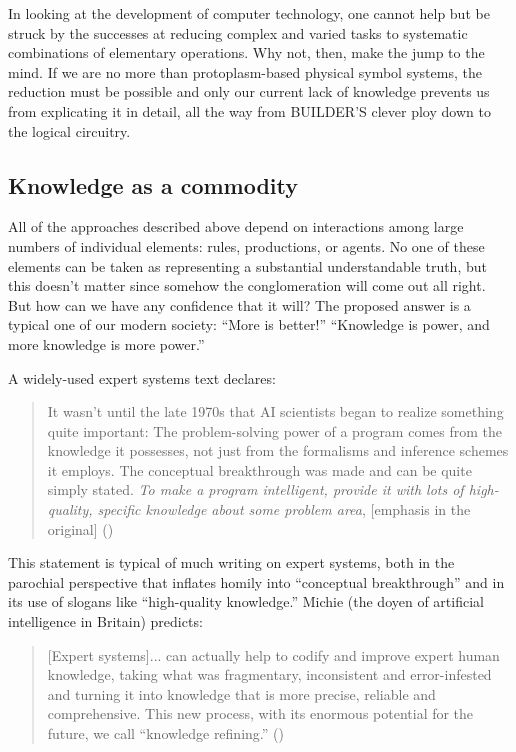 \documentclass[12pt]{article}
\def\bq{\begin{quote}}
\def\eq{\end{quote}}
\begin{document}
In looking at the development of computer technology, one cannot help but be struck by the successes at reducing complex and varied tasks to systematic combinations of elementary operations. Why not, then, make the jump to the mind. If we are no more than protoplasm-based physical symbol systems, the reduction must be possible and only our current lack of knowledge prevents us from explicating it in detail, all the way from BUILDER'S clever ploy down to the logical circuitry.

\subsection{Knowledge as a commodity}

All of the approaches described above depend on interactions among large numbers of individual elements: rules, productions, or agents. No one of these elements can be taken as representing a substantial understandable truth, but this doesn't matter since somehow the conglomeration will come out all right. But how can we have any confidence that it will? The proposed answer is a typical one of our modern society: ``More is better!'' ``Knowledge is power, and more knowledge is more power.''

A widely-used expert systems text declares:

\bq
It wasn't until the late 1970s that AI scientists began to realize something quite important: The problem-solving power of a program comes from the knowledge it possesses, not just from the formalisms and inference schemes it employs. The conceptual breakthrough was made and can be quite simply stated. {\it To make a program intelligent, provide it with lots of high-quality, specific knowledge about some problem area}, [emphasis in the original] ({\it \cite{waterman1985}})
\eq

This statement is typical of much writing on expert systems, both in the parochial perspective that inflates homily into ``conceptual breakthrough'' and in its use of slogans like ``high-quality knowledge.'' Michie (the doyen of artificial intelligence in Britain) predicts:

\bq
[Expert systems]... can actually help to codify and improve expert human knowledge, taking what was fragmentary, inconsistent and error-infested and turning it into knowledge that is more precise, reliable and comprehensive. This new process, with its enormous potential for the future, we call ``knowledge refining.'' ({\it \cite{michie1984}})
\eq
\end{document}
